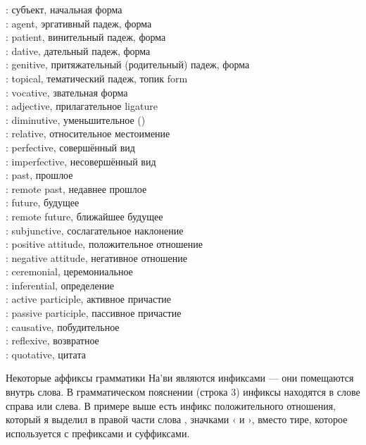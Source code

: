 \begin{multicols}{2}
\noindent{}: субъект, начальная форма \\
: agent, эргативный падеж, форма  \\
: patient, винительный падеж, форма  \\
: dative, дательный падеж, форма  \\
: genitive, притяжательный (родительный) падеж, форма
 \\
: topical, тематический падеж, топик  form \\
: vocative, звательная форма  \\
: adjective, прилагательное  ligature\\
: diminutive, уменьшительное () \\
: relative, относительное местоимение  \\
: perfective, совершённый вид \\
: imperfective, несовершённый вид \\
: past, прошлое \\
: remote past, недавнее прошлое \\
: future, будущее \\
: remote future, ближайшее будущее \\
: subjunctive, сослагательное наклонение \\
: positive attitude, положительное отношение \\
: negative attitude, негативное отношение \\
: ceremonial, церемониальное \\
: inferential, определение \\
: active participle, активное причастие \\
: passive participle, пассивное причастие \\
: causative, побудительное \\
: reflexive, возвратное \\
: quotative, цитата 
\end{multicols}

\noindent Некоторые аффиксы грамматики На'ви являются инфиксами
— они помещаются внутрь слова. В грамматическом пояснении
(строка 3) инфиксы находятся в слове справа или слева. В примере
выше есть инфикс положительного отношения, который я выделил в
правой части слова , значками ‹
и ›, вместо тире, которое используется с префиксами и
суффиксами.

